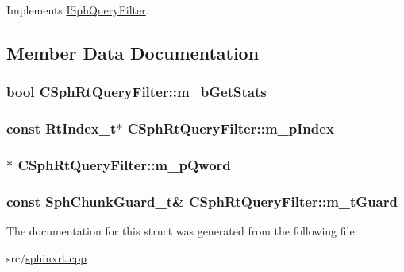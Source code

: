 Implements \hyperlink{structISphQueryFilter_a60a77d39d557bbe78b591a239e850df4}{I\-Sph\-Query\-Filter}.



\subsection{Member Data Documentation}
\hypertarget{structCSphRtQueryFilter_a6b47b46b88ae0898296d787bc817a2b5}{
\subsubsection[{m\-\_\-b\-Get\-Stats}]{\setlength{\rightskip}{0pt plus 5cm}bool C\-Sph\-Rt\-Query\-Filter\-::m\-\_\-b\-Get\-Stats}}\label{structCSphRtQueryFilter_a6b47b46b88ae0898296d787bc817a2b5}
\hypertarget{structCSphRtQueryFilter_a638a5f594555b01754833fde7f823f77}{
\subsubsection[{m\-\_\-p\-Index}]{\setlength{\rightskip}{0pt plus 5cm}const {\bf Rt\-Index\-\_\-t}$\ast$ C\-Sph\-Rt\-Query\-Filter\-::m\-\_\-p\-Index}}\label{structCSphRtQueryFilter_a638a5f594555b01754833fde7f823f77}
\hypertarget{structCSphRtQueryFilter_a1bb30f6995b3ea86335d791c06a97323}{
\subsubsection[{m\-\_\-p\-Qword}]{$\ast$ C\-Sph\-Rt\-Query\-Filter\-::m\-\_\-p\-Qword}}\label{structCSphRtQueryFilter_a1bb30f6995b3ea86335d791c06a97323}
\hypertarget{structCSphRtQueryFilter_a900f79e54addfd862617a060c93a342d}{
\subsubsection[{m\-\_\-t\-Guard}]{\setlength{\rightskip}{0pt plus 5cm}const {\bf Sph\-Chunk\-Guard\-\_\-t}\& C\-Sph\-Rt\-Query\-Filter\-::m\-\_\-t\-Guard}}\label{structCSphRtQueryFilter_a900f79e54addfd862617a060c93a342d}


The documentation for this struct was generated from the following file\-:\begin{DoxyCompactItemize}
\item 
src/\hyperlink{sphinxrt_8cpp}{sphinxrt.\-cpp}\end{DoxyCompactItemize}

